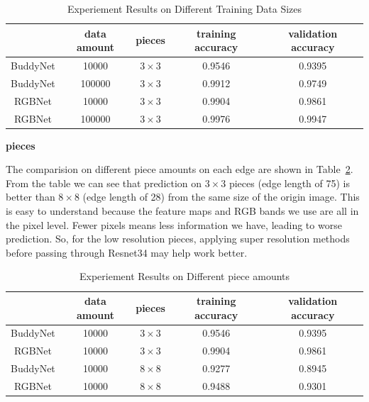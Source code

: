 \documentclass{article}
\begin{document}
\begin{table}
    \caption{Experiement Results on Different Training Data Sizes}
    \centering
    \label{tab:expamount}
    \begin{tabular}{c|c|c|c|c}
        \hline
        & data amount & pieces & training accuracy & validation accuracy\\
        \hline
        BuddyNet & 10000 & $3\times 3$ & 0.9546 & 0.9395\\
        \hline
        BuddyNet & 100000 & $3\times 3$ & 0.9912 & 0.9749\\
        \hline
        RGBNet & 10000 & $3\times 3$ & 0.9904 & 0.9861\\
        \hline
        RGBNet & 100000 & $3\times 3$ & 0.9976 & 0.9947\\
        \hline
    \end{tabular}
\end{table}

\textbf{pieces}

The comparision on different piece amounts on each edge are shown in Table~\ref{tab:exppiece}. From the table we can see that prediction on $3\times 3$ pieces (edge length of 75) is better than $8\times 8$ (edge length of 28) from the same size of the origin image. This is easy to understand because the feature maps and RGB bands we use are all in the pixel level. Fewer pixels means less information we have, leading to worse prediction. So, for the low resolution pieces, applying super resolution methods before passing through Resnet34 may help work better.

\begin{table}
    \caption{Experiement Results on Different piece amounts}
    \centering
    \label{tab:exppiece}
    \begin{tabular}{c|c|c|c|c}
        \hline
        & data amount & pieces & training accuracy & validation accuracy\\
        \hline
        BuddyNet & 10000 & $3\times 3$ & 0.9546 & 0.9395\\
        \hline
        RGBNet & 10000 & $3\times 3$ & 0.9904 & 0.9861\\
        \hline
        BuddyNet & 10000 & $8\times 8$ & 0.9277 & 0.8945\\
        \hline
        RGBNet & 10000 & $8\times 8$ & 0.9488 & 0.9301\\
        \hline
    \end{tabular}
\end{table}
\end{document}
